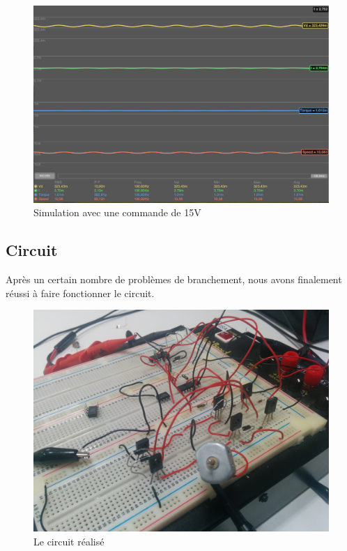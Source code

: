 \documentclass[a4paper]{article}
\begin{document}
\begin{figure}[H]
	\centering
	\includegraphics[width=1\textwidth]{simu15v}
	\caption{Simulation avec une commande de 15V}
\end{figure}

\subsection{Circuit}

Après un certain nombre de problèmes de branchement, nous avons finalement réussi à faire fonctionner le circuit.

\begin{figure}[H]
  \centering
    \includegraphics[width=1\textwidth]{circuit}
  \caption{Le circuit réalisé}
\end{figure}
\end{document}
